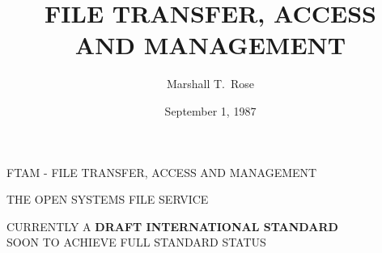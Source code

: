 

\makeatletter
\def\@maketitle{%
    \newpage
    \null
    \setbox\z@=\vbox{%
	\ \vskip .75em
	\begin{center}
	    {\huge\bf \@title \par}%
	    \vskip .5em
	    {\Large\bf			%
		\lineskip=.25em 
		\begin{tabular}[t]{c}
		    \@author 
		\end{tabular}
		\par
	    }%
	    \vskip .25em		%
	    {\Large\bf \@date}%
	\end{center}
	\par
	\vskip .75em
    }%
    \if@ovaltitle
	\title@ht=\ht\z@	\title@wd=\wd\z@
	\title@@ht=\ht\z@	\title@@wd=\wd\z@
	\divide\title@@ht by2	\divide\title@@wd by2
	\unitlength=1sp
    \fi
    \box\z@
    \if@ovaltitle
	\vskip -\title@ht\unitlength
	{\centering
	    \begin{picture}(\title@wd,\title@ht)
		\put(\title@@wd,\title@@ht){\oval(\title@wd,\title@ht)}
	    \end{picture}
	\par}
    \fi
}
\makeatother

\raggedright



\title	{FILE TRANSFER, ACCESS\\ AND MANAGEMENT}
\author	{Marshall T.~Rose}
\date	{September 1, 1987}
\maketitlepage


\begin{bwslide}

\begin{nrtc}
\item	FTAM - FILE TRANSFER, ACCESS AND MANAGEMENT

\item	THE OPEN SYSTEMS FILE SERVICE

\item	CURRENTLY A {\bf DRAFT INTERNATIONAL STANDARD}\\
	SOON TO ACHIEVE FULL STANDARD STATUS
\end{nrtc}
\end{bwslide}


